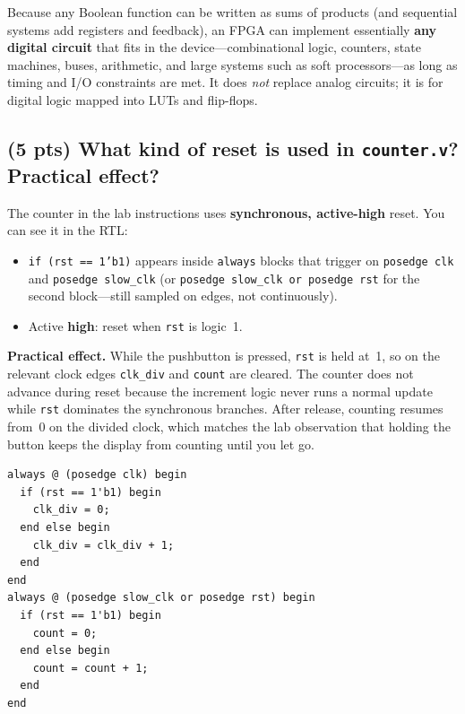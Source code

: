 \documentclass[12pt, letterpaper]{article}
\begin{document}
Because any Boolean function can be written as sums of products (and sequential systems add
registers and feedback), an FPGA can implement essentially \textbf{any digital circuit} that
fits in the device---combinational logic, counters, state machines, buses, arithmetic, and
large systems such as soft processors---as long as timing and I/O constraints are met.  It
does \emph{not} replace analog circuits; it is for digital logic mapped into LUTs and
flip-flops.

\subsection{(5 pts) What kind of reset is used in \texttt{counter.v}?  Practical effect?}

The counter in the lab instructions uses \textbf{synchronous, active-high} reset.  You can see it in the RTL:

\begin{itemize}
  \item \texttt{if (rst == 1'b1)} appears inside \texttt{always} blocks that trigger on
        \texttt{posedge clk} and \texttt{posedge slow\_clk} (or \texttt{posedge slow\_clk or
        posedge rst} for the second block---still sampled on edges, not continuously).
  \item Active \textbf{high}: reset when \texttt{rst} is logic~1.
\end{itemize}

\textbf{Practical effect.}  While the pushbutton is pressed, \texttt{rst} is held at~1, so on
the relevant clock edges \texttt{clk\_div} and \texttt{count} are cleared.  The counter does
not advance during reset because the increment logic never runs a normal update while
\texttt{rst} dominates the synchronous branches.  After release, counting resumes from~0 on
the divided clock, which matches the lab observation that holding the button keeps the
display from counting until you let go.

\begin{lstlisting}[caption={Excerpt: synchronous active-high reset (from the lab counter code).}]
always @ (posedge clk) begin
  if (rst == 1'b1) begin
    clk_div = 0;
  end else begin
    clk_div = clk_div + 1;
  end
end
always @ (posedge slow_clk or posedge rst) begin
  if (rst == 1'b1) begin
    count = 0;
  end else begin
    count = count + 1;
  end
end
\end{lstlisting}
\end{document}
